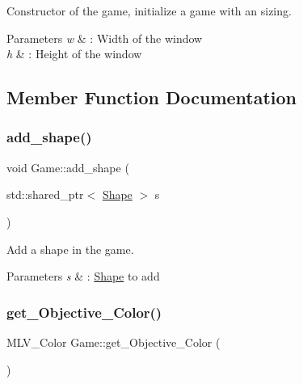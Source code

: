 Constructor of the game, initialize a game with an sizing. 


\begin{DoxyParams}{Parameters}
{\em w} & \+: Width of the window \\
\hline
{\em h} & \+: Height of the window \\
\hline
\end{DoxyParams}


\subsection{Member Function Documentation}
\mbox{\label{classGame_aab43fea0e202c203d998ae575d3f6eeb}} 
\subsubsection{\texorpdfstring{add\+\_\+shape()}{add\_shape()}}
{\footnotesize\ttfamily void Game\+::add\+\_\+shape (\begin{DoxyParamCaption}\item[{std\+::shared\+\_\+ptr$<$ \hyperlink{classShape}{Shape} $>$}]{s }\end{DoxyParamCaption})}



Add a shape in the game. 


\begin{DoxyParams}{Parameters}
{\em s} & \+: \hyperlink{classShape}{Shape} to add \\
\hline
\end{DoxyParams}
\mbox{\label{classGame_ac5de4b11ae90a7ea9182621039fa511c}} 
\subsubsection{\texorpdfstring{get\+\_\+\+Objective\+\_\+\+Color()}{get\_Objective\_Color()}}
{\footnotesize\ttfamily M\+L\+V\+\_\+\+Color Game\+::get\+\_\+\+Objective\+\_\+\+Color (\begin{DoxyParamCaption}{ }\end{DoxyParamCaption})}



